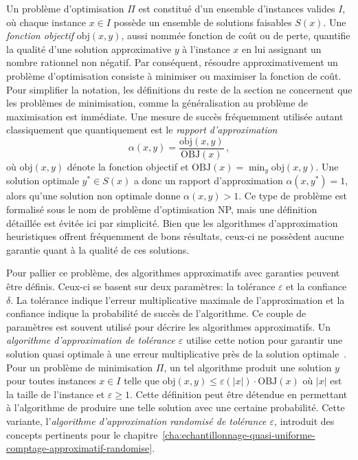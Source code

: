 Un problème d'optimisation $\Pi$ est constitué d'un ensemble d'instances valides $I$, où chaque instance $x \in I$ possède un ensemble de solutions faisables $S(x)$. Une \textit{fonction objectif} $\text{obj}(x,y)$, aussi nommée fonction de coût ou de perte, quantifie la qualité d'une solution approximative $y$ à l'instance $x$ en lui assignant un nombre rationnel non négatif. Par conséquent, résoudre approximativement un problème d'optimisation consiste à minimiser ou maximiser la fonction de coût. Pour simplifier la notation, les définitions du reste de la section ne concernent que les problèmes de minimisation, comme la généralisation au problème de maximisation est immédiate. Une mesure de succès fréquemment utilisée autant classiquement que quantiquement est le \textit{rapport d'approximation}
\begin{equation}
    \alpha(x, y) = \frac{\text{obj}(x, y)}{\text{OBJ}(x)} \,,
\end{equation}
où $\text{obj}(x,y)$ dénote la fonction objectif et $\text{OBJ}(x) = \min_{y} \text{obj} (x, y)$. Une solution optimale $y^{*} \in S(x)$ a donc un rapport d'approximation $\alpha(x, y^{*})=1$, alors qu'une solution non optimale donne $\alpha(x, y) > 1$. Ce type de problème est formalisé sous le nom de problème d'optimisation \textsf{NP}, mais une définition détaillée est évitée ici par simplicité. Bien que les algorithmes d'approximation heuristiques offrent fréquemment de bons résultats, ceux-ci ne possèdent aucune garantie quant à la qualité de ces solutions.

Pour pallier ce problème, des algorithmes approximatifs avec garanties peuvent être définis. Ceux-ci se basent sur deux paramètres: la tolérance $\varepsilon$ et la confiance $\delta$. La tolérance indique l'erreur multiplicative maximale de l'approximation et la confiance indique la probabilité de succès de l'algorithme. Ce couple de paramètres est souvent utilisé pour décrire les algorithmes approximatifs. Un \textit{algorithme d'approximation de tolérance $\varepsilon$} utilise cette notion pour garantir une solution quasi optimale à une erreur multiplicative près de la solution optimale~\cite{vaziraniApproximationAlgorithms2003}. Pour un problème de minimisation $\Pi$, un tel algorithme produit une solution $y$ pour toutes instances $x \in I$ telle que $\text{obj}(x, y) \leq \varepsilon(\lvert x \rvert ) \cdot \text{OBJ}(x)$ où $\lvert  x \rvert $ est la taille de l'instance et $\varepsilon \geq 1   $. Cette définition peut être détendue en permettant à l'algorithme de produire une telle solution avec une certaine probabilité. Cette variante, l'\textit{algorithme d'approximation randomisé de tolérance $\varepsilon$}, introduit des concepts pertinents pour le chapitre~\ref{cha:echantillonnage-quasi-uniforme-comptage-approximatif-randomise}.

